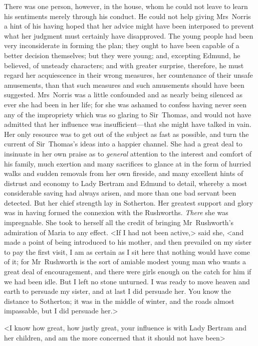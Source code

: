 There was one person, however, in the house, whom he could not leave to learn his sentiments merely through his conduct. He could not help giving Mrs~Norris a hint of his having hoped that her advice might have been interposed to prevent what her judgment must certainly have disapproved. The young people had been very inconsiderate in forming the plan; they ought to have been capable of a better decision themselves; but they were young; and, excepting Edmund, he believed, of unsteady characters; and with greater surprise, therefore, he must regard her acquiescence in their wrong measures, her countenance of their unsafe amusements, than that such measures and such amusements should have been suggested. Mrs~Norris was a little confounded and as nearly being silenced as ever she had been in her life; for she was ashamed to confess having never seen any of the impropriety which was so glaring to Sir~Thomas, and would not have admitted that her influence was insufficient—that she might have talked in vain. Her only resource was to get out of the subject as fast as possible, and turn the current of Sir~Thomas's ideas into a happier channel. She had a great deal to insinuate in her own praise as to \textit{general}  attention to the interest and comfort of his family, much exertion and many sacrifices to glance at in the form of hurried walks and sudden removals from her own fireside, and many excellent hints of distrust and economy to Lady Bertram and Edmund to detail, whereby a most considerable saving had always arisen, and more than one bad servant been detected. But her chief strength lay in Sotherton. Her greatest support and glory was in having formed the connexion with the Rushworths. \textit{There}  she was impregnable. She took to herself all the credit of bringing Mr~Rushworth's admiration of Maria to any effect. <If I had not been active,> said she, <and made a point of being introduced to his mother, and then prevailed on my sister to pay the first visit, I am as certain as I sit here that nothing would have come of it; for Mr~Rushworth is the sort of amiable modest young man who wants a great deal of encouragement, and there were girls enough on the catch for him if we had been idle. But I left no stone unturned. I was ready to move heaven and earth to persuade my sister, and at last I did persuade her. You know the distance to Sotherton; it was in the middle of winter, and the roads almost impassable, but I did persuade her.>

<I know how great, how justly great, your influence is with Lady Bertram and her children, and am the more concerned that it should not have been\longdash>

